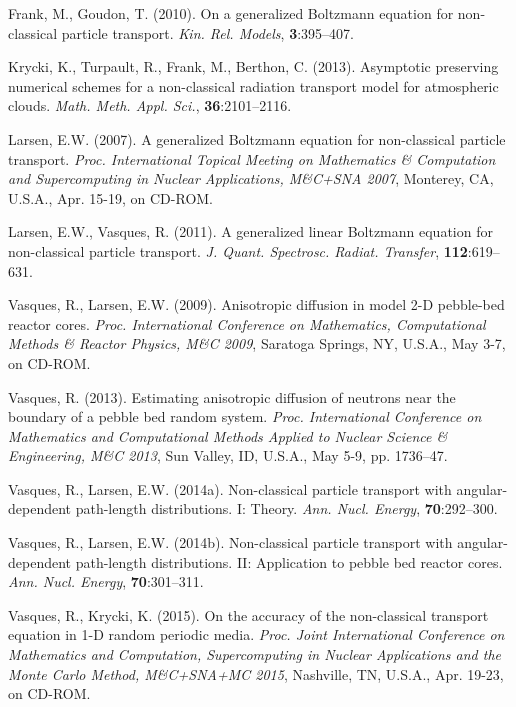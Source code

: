 \documentclass[12pt]{article}
\begin{document}
\begin{thebibliography}{}

Frank, M., Goudon, T. (2010). On a generalized Boltzmann equation for non-classical particle transport. {\it Kin. Rel. Models}, {\bf 3}:395--407.

Krycki, K., Turpault, R., Frank, M., Berthon, C. (2013). Asymptotic preserving numerical schemes for a non-classical radiation transport model for atmospheric clouds. {\it Math. Meth. Appl. Sci.}, {\bf 36}:2101--2116.

Larsen, E.W. (2007). A generalized Boltzmann equation for non-classical particle transport. {\it
Proc. International Topical Meeting on Mathematics \& Computation and Supercomputing in Nuclear Applications,
M\&C+SNA 2007}, Monterey, CA, U.S.A., Apr. 15-19, on CD-ROM.

Larsen, E.W., Vasques, R. (2011). A generalized linear Boltzmann equation for non-classical
particle transport. {\it J. Quant. Spectrosc. Radiat. Transfer}, {\bf 112}:619--631.

Vasques, R., Larsen, E.W. (2009). Anisotropic diffusion in model 2-D pebble-bed reactor cores. {\it
Proc. International Conference on Mathematics, Computational Methods \& Reactor Physics, M\&C 2009},
Saratoga Springs, NY, U.S.A., May 3-7, on CD-ROM.

Vasques, R. (2013). Estimating anisotropic diffusion of neutrons near the boundary of a pebble bed random system. {\it Proc. International Conference on Mathematics and Computational Methods Applied to Nuclear Science \& Engineering, M\&C 2013}, Sun Valley, ID, U.S.A., May 5-9, pp. 1736--47.

Vasques, R., Larsen, E.W. (2014a). Non-classical particle transport with angular-dependent path-length
distributions. I: Theory. {\it Ann. Nucl. Energy}, {\bf 70}:292--300.

Vasques, R., Larsen, E.W. (2014b). Non-classical particle transport with angular-dependent path-length
distributions. II: Application to pebble bed reactor cores. {\it Ann. Nucl. Energy}, 
{\bf 70}:301--311.

Vasques, R., Krycki, K. (2015). On the accuracy of the non-classical transport equation in 1-D random periodic media. {\it Proc. Joint International Conference on Mathematics and Computation, Supercomputing in Nuclear Applications and the Monte Carlo Method, M\&C+SNA+MC 2015}, Nashville, TN, U.S.A., Apr. 19-23, on CD-ROM.


\end{thebibliography}
\end{document}
